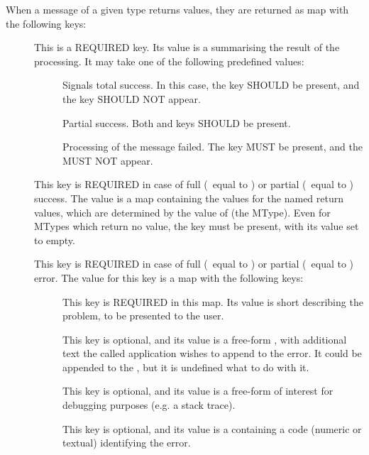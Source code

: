 		When a message of a given type returns values, they are
		returned as map with the following keys:
		
		\begin{description}
			\item[\sampstatus] This is a REQUIRED key.
			Its value is a \stringtype{} summarising the result
			of the processing. It may take one of the following
			predefined values:
			
			\begin{description}
				\item[\sampok] Signals total
				success. In this case, the \sampresult{} key
				SHOULD be present, and the \samperror{} key
				SHOULD NOT appear.
				
				\item[\sampwarning] Partial success. Both
				\sampresult{} and \samperror{} keys
				SHOULD be present.
				
				\item[\samperror] Processing of the
				message failed. The \samperror{} key MUST
				be present, and the \sampresult{} MUST NOT
				appear.
			\end{description}
			
			\item[\sampresult] This key is REQUIRED in case
			of full (\sampstatus\ equal to \sampok) or partial
			(\sampstatus\ equal to \sampwarning) success. The
			value is a map containing the values for the
			named return values, which are determined by the
			value of \sampmtype{} (the MType). Even for MTypes
			which return no value, the key must be present,
			with its value set to empty.
			
			\item[\samperror] This key is REQUIRED in case
			of full (\sampstatus\ equal to \samperror) or
			partial (\sampstatus\ equal to \sampwarning) error.
			The value for this key is a map with the following
			keys:
			
			\begin{description}
				\item[] This key is
				REQUIRED in this map. Its value is short
				\stringtype{} describing the problem, to be
				presented to the user.
				
				
				\item[] This key is
				optional, and its value is a free-form
				\stringtype, with additional text the
				called application wishes to append to the error.
				It could be appended to the ,
				but it is undefined what to do with it.
				
				\item[] This key is optional,
				and its value is a free-form \stringtype{} of interest
				for debugging purposes (e.g. a stack trace).
				
				\item[] This key is optional, and
				its value is a \stringtype{} containing a code
				(numeric or textual) identifying the error.
			\end{description}
		\end{description}
		
